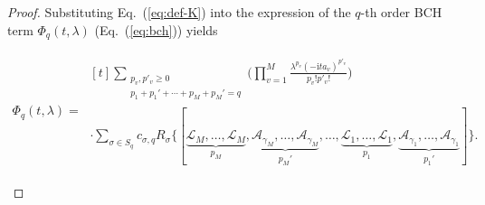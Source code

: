 \documentclass[aps,pra,reprint,groupedaddress,floatfix]{revtex4-2}
\newcommand{\eq}[1]{(\ref{eq:#1})}
\renewcommand{\i}{\mathrm{i}}
\newcommand{\A}{\mathcal{A}}
\newcommand{\mc}{\mathcal}
\begin{document}
\begin{proof}
 	Substituting Eq.~\eq{def-K} into the expression of the $q$-th order BCH term $\Phi_q(t,\lambda)$ (Eq.~\eq{bch}) yields 
 	\begin{widetext}
 	\begin{align}
 	 	\Phi_q(t,\lambda)
 	 	=~ \begin{multlined}[t]
 	 	 	\sum_{\substack{p_v,p'_v\ge 0\\ p_1+p_1'+\cdots+p_M+p_M'=q }}\bigg(\prod_{v=1}^M \frac{\lambda^{p_v}(-\i ta_v)^{p'_v}}{p_v!p'_v!} \bigg) \\ 
 	 	\cdot \sum_{\sigma\in S_q} c_{\sigma, q}R_{\sigma}\big\{[\underbrace{\mc L_M, \ldots,\mc L_M}_{p_M}, \underbrace{\A_{\gamma_M}, \ldots, \mc A_{\gamma_M}}_{p_M'}, \ldots, \underbrace{ \mc L_1,  \ldots, \mc L_1}_{p_1}, \underbrace{\A_{\gamma_1},  \ldots, \mc A_{\gamma_1}}_{p_1'}]\big\}.\label{eq:Z_q}\end{multlined}
 	\end{align}
 	\end{widetext}
 	

\end{proof}
\end{document}
